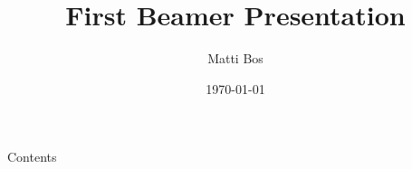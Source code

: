 

\title{First Beamer Presentation}
\author{Matti Bos}
\date{\today}



\thispagestyle{empty} %
\maketitle

\begin{frame}[allowframebreaks]{Contents}
\tableofcontents
\end{frame}








